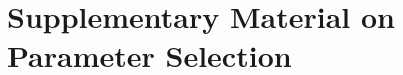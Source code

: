 \documentclass[11pt, twoside, openright]{thesis}
\begin{document}


\printbibliography



\appendix
\chapter{Supplementary Material on Parameter Selection}







\end{document}
